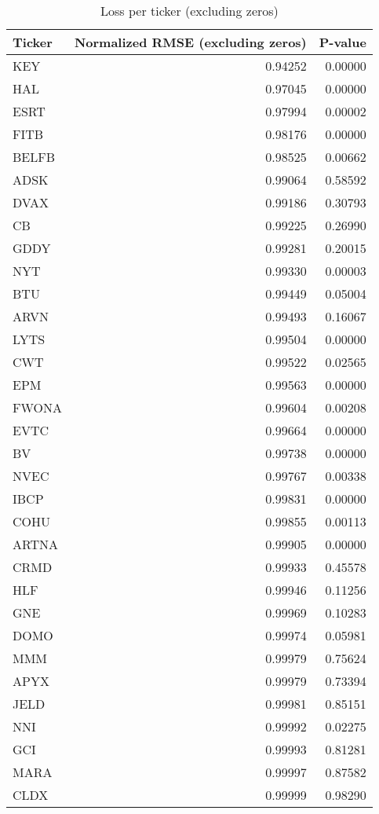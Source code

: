 \begin{table}[H]
\centering
\caption{Loss per ticker (excluding zeros)}
\label{tab:loss_per_ticker_1}
\begin{tabular}{lrr}
\toprule
Ticker & Normalized RMSE (excluding zeros) & P-value \\
\midrule
KEY & 0.94252 & 0.00000 \\
HAL & 0.97045 & 0.00000 \\
ESRT & 0.97994 & 0.00002 \\
FITB & 0.98176 & 0.00000 \\
BELFB & 0.98525 & 0.00662 \\
ADSK & 0.99064 & 0.58592 \\
DVAX & 0.99186 & 0.30793 \\
CB & 0.99225 & 0.26990 \\
GDDY & 0.99281 & 0.20015 \\
NYT & 0.99330 & 0.00003 \\
BTU & 0.99449 & 0.05004 \\
ARVN & 0.99493 & 0.16067 \\
LYTS & 0.99504 & 0.00000 \\
CWT & 0.99522 & 0.02565 \\
EPM & 0.99563 & 0.00000 \\
FWONA & 0.99604 & 0.00208 \\
EVTC & 0.99664 & 0.00000 \\
BV & 0.99738 & 0.00000 \\
NVEC & 0.99767 & 0.00338 \\
IBCP & 0.99831 & 0.00000 \\
COHU & 0.99855 & 0.00113 \\
ARTNA & 0.99905 & 0.00000 \\
CRMD & 0.99933 & 0.45578 \\
HLF & 0.99946 & 0.11256 \\
GNE & 0.99969 & 0.10283 \\
DOMO & 0.99974 & 0.05981 \\
MMM & 0.99979 & 0.75624 \\
APYX & 0.99979 & 0.73394 \\
JELD & 0.99981 & 0.85151 \\
NNI & 0.99992 & 0.02275 \\
GCI & 0.99993 & 0.81281 \\
MARA & 0.99997 & 0.87582 \\
CLDX & 0.99999 & 0.98290 \\
\bottomrule
\end{tabular}
\end{table}
